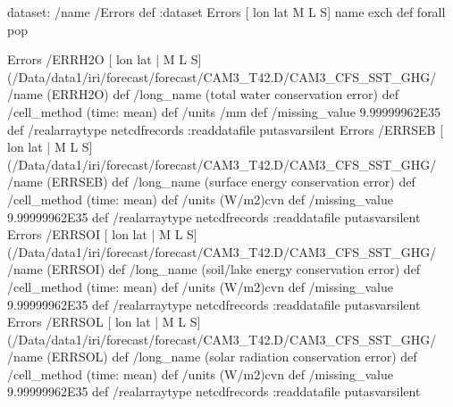 \begin{ingrid}
dataset: /name /Errors def :dataset
Errors [ lon lat M L S] {name exch def} forall pop

Errors /ERRH2O{
[ lon lat | M L S] (/Data/data1/iri/forecast/forecast/CAM3_T42.D/CAM3_CFS_SST_GHG/%
/name (ERRH2O) def
 /long_name (total water conservation error) def
 /cell_method (time: mean) def
 /units /mm def
 /missing_value 9.99999962E35 def
 /realarraytype netcdfrecords :readdatafile
}putasvarsilent
Errors /ERRSEB{
[ lon lat | M L S] (/Data/data1/iri/forecast/forecast/CAM3_T42.D/CAM3_CFS_SST_GHG/%
/name (ERRSEB) def
 /long_name (surface energy conservation error) def
 /cell_method (time: mean) def
 /units (W/m2)cvn def
 /missing_value 9.99999962E35 def
 /realarraytype netcdfrecords :readdatafile
}putasvarsilent
Errors /ERRSOI{
[ lon lat | M L S] (/Data/data1/iri/forecast/forecast/CAM3_T42.D/CAM3_CFS_SST_GHG/%
/name (ERRSOI) def
 /long_name (soil/lake energy conservation error) def
 /cell_method (time: mean) def
 /units (W/m2)cvn def
 /missing_value 9.99999962E35 def
 /realarraytype netcdfrecords :readdatafile
}putasvarsilent
Errors /ERRSOL{
[ lon lat | M L S] (/Data/data1/iri/forecast/forecast/CAM3_T42.D/CAM3_CFS_SST_GHG/%
/name (ERRSOL) def
 /long_name (solar radiation conservation error) def
 /cell_method (time: mean) def
 /units (W/m2)cvn def
 /missing_value 9.99999962E35 def
 /realarraytype netcdfrecords :readdatafile
}putasvarsilent


\end{ingrid}
